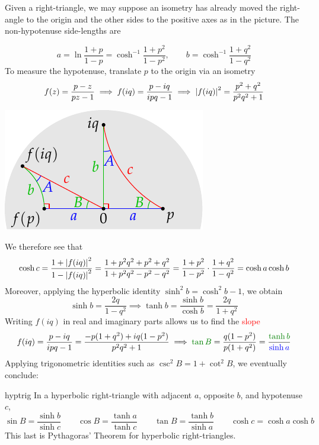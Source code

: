 Given a right-triangle, we may suppose an isometry has already moved the right-angle to the origin and the other sides to the positive axes as in the picture. The non-hypotenuse side-lengths are\par
\begin{minipage}[t]{0.675\linewidth}\vspace{-8pt}
	\[
		a=\ln\frac{1+p}{1-p}=\cosh^{-1}\frac{1+p^2}{1-p^2},\qquad b=\cosh^{-1}\frac{1+q^2}{1-q^2}
	\]
	To measure the hypotenuse, translate $p$ to the origin via an isometry
	\[
		f(z)=\frac{p-z}{pz-1} \implies f(iq)=\frac{p-iq}{ipq-1} \implies \left| f(iq)\right|^2=\frac{p^2+q^2}{p^2q^2+1}
	\]
\end{minipage}
\hfill
\begin{minipage}[t]{0.3\linewidth}\vspace{0pt}
	\flushright\includegraphics[scale=0.9]{isom-right}
\end{minipage}\medbreak
We therefore see that
\[
	\cosh c=\frac{1+\left| f(iq)\right|^2}{1-\left| f(iq)\right|^2}  =\frac{1+p^2q^2+p^2+q^2}{1+p^2q^2-p^2-q^2} =\frac{1+p^2}{1-p^2}\cdot\frac{1+q^2}{1-q^2} =\cosh a\cosh b
\]
Moreover, applying the hyperbolic identity $\sinh^2b=\cosh^2b-1$, we obtain
\[
	\sinh b=\frac{2q}{1-q^2}\implies \tanh b=\frac{\sinh b}{\cosh b} =\frac{2q}{1+q^2}
\]
Writing $f(iq)$ in real and imaginary parts allows us to find the \textcolor{red}{slope}
\[
	f(iq)=\frac{p-iq}{ipq-1} =\frac{-p(1+q^2)+iq(1-p^2)}{p^2q^2+1}\implies \textcolor{Green}{\tan B}=\frac{q(1-p^2)}{p(1+q^2)} =\frac{\textcolor{Green}{\tanh b}}{\textcolor{blue}{\sinh a}}
\]
Applying trigonometric identities such as $\csc^2B=1+\cot^2B$, we eventually conclude:

\begin{thm}{}{hyptrig}
	In a hyperbolic right-triangle with adjacent $a$, opposite $b$, and hypotenuse $c$,
	\[
		\sin B=\frac{\sinh b}{\sinh c}\qquad \cos B=\frac{\tanh a}{\tanh c}\qquad  \tan B=\frac{\tanh b}{\sinh a}\qquad \cosh c=\cosh a\cosh b
	\]
	This last is Pythagoras' Theorem for hyperbolic right-triangles.
\end{thm}


